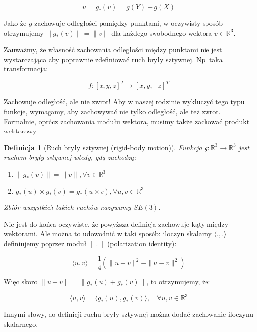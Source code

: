 \documentclass[a4paper,12pt]{article}
\newtheorem{defi}{Definicja}
\newcommand{\RR}{\mathbb{R}^3}
\newcommand{\vecs}[2]{\langle #1 , #2 \rangle}
\begin{document}
\begin{equation}
u = g_*(v) = g(Y) - g(X)
\end{equation}

Jako że $g$ zachowuje odległości pomiędzy punktami, w oczywisty sposób otrzymujemy $\| g_*(v) \| = \| v \|$ dla każdego swobodnego wektora $v \in \RR$.

Zauważmy, że własność zachowania odległości między punktami nie jest wystarczająca aby poprawnie zdefiniować ruch bryły sztywnej. Np. taka transformacja:

\begin{equation}
f : [x,y,z]^T \rightarrow [x,y,-z]^T
\end{equation}

Zachowuje odległość, ale nie zwrot! Aby w naszej rodzinie wykluczyć tego typu funkcje, wymagamy, aby zachowywać nie tylko odległość, ale też zwrot. Formalnie, oprócz zachowania modułu wektora, musimy także zachować produkt wektorowy.

\begin{defi}[Ruch bryły sztywnej (rigid-body motion)]
Funkcja $g: \RR \rightarrow \RR$ jest ruchem bryły sztywnej wtedy, gdy zachodzą:

\begin{enumerate}
\item $\| g_*(v) \|  = \| v \| , \forall v \in \RR$
\item $g_*(u) \times g_*(v) = g_*(u \times v), \forall u,v \in \RR$
\end{enumerate}

\noindent Zbiór wszystkich takich ruchów nazywamy $SE(3)$.
\end{defi}

Nie jest do końca oczywiste, że powyższa definicja zachowuje kąty między wektorami. Ale można to udowodnić w taki sposób: iloczyn skalarny $\vecs{.}{.}$ definiujemy poprzez moduł $\| . \|$ (polarization identity):

\begin{equation}
\vecs{u}{v} = \frac{1}{4}( \| u+v \|^2 - \| u-v \|^2)
\end{equation}

Więc skoro $\| u+v \| = \| g_*(u)+g_*(v) \|$, to otrzymujemy, że:

\begin{equation}
\vecs{u}{v} = \vecs{g_*(u)}{g_*(v)}, \quad \forall u,v \in \RR
\end{equation}

\noindent Innymi słowy, do definicji ruchu bryły sztywnej można dodać zachowanie iloczynu skalarnego.
\end{document}
